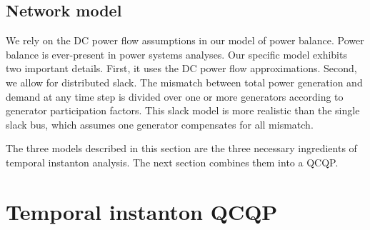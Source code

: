 \documentclass[conference]{IEEEtran}
\begin{document}
%

\subsection{Network model}

We rely on the DC power flow assumptions in our model of power balance. Power balance is ever-present in power systems analyses. Our specific model exhibits two important details. First, it uses the DC power flow approximations. Second, we allow for distributed slack. The mismatch between total power generation and demand at any time step is divided over one or more generators according to generator participation factors. This slack model is more realistic than the single slack bus, which assumes one generator compensates for all mismatch.

The three models described in this section are the three necessary ingredients of temporal instanton analysis. The next section combines them into a QCQP.

\section{Temporal instanton QCQP}\label{sec:qcqp}
\end{document}
